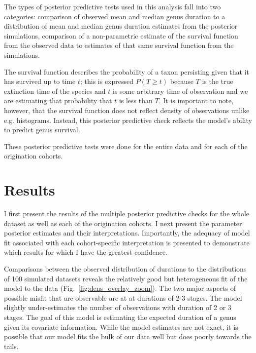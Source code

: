 \documentclass[11pt]{article}
\begin{document}
The types of posterior predictive tests used in this analysis fall into two categories: comparison of observed mean and median genus duration to a distribution of mean and median genus duration estimates from the posterior simulations, comparison of a non-parametric estimate of the survival function from the observed data to estimates of that same survival function from the simulations. 

The survival function describes the probability of a taxon persisting given that it has survived up to time \(t\); this is expressed \(P(T \geq t)\) because \(T\) is the true extinction time of the species and \(t\) is some arbitrary time of observation and we are estimating that probability that \(t\) is less than \(T\). It is important to note, however, that the survival function does not reflect density of observations unlike e.g. histograms. Instead, this posterior predictive check reflects the model's ability to predict genus survival.

These posterior predictive tests were done for the entire data and for each of the origination cohorts.







\section*{Results}
I first present the results of the multiple posterior predictive checks for the whole dataset as well as each of the origination cohorts. I next present the parameter posterior estimates and their interpretations. Importantly, the adequacy of model fit associated with each cohort-specific interpretation is presented to demonstrate which results for which I have the greatest confidence.


Comparisons between the observed distribution of durations to the distributions of 100 simulated datasets reveals the relatively good but heterogeneous fit of the model to the data (Fig.~\ref{fig:dens_overlay_zoom}). The two major aspects of possible misfit that are observable are at at durations of 2-3 stages. The model slightly under-estimates the number of observations with duration of 2 or 3 stages. The goal of this model is estimating the expected duration of a genus given its covariate information. While the model estimates are not exact, it is possible that our model fits the bulk of our data well but does poorly towards the tails. 
\end{document}
